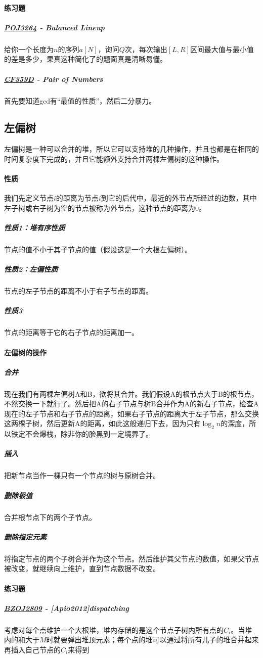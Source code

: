 \documentclass[]{cpp}
\begin{document}
\paragraph{练习题}
\subparagraph{\href{http://poj.org/problem?id=3264}{POJ3264} - Balanced Lineup}
	给你一个长度为$n$的序列$a[N]$，询问$Q$次，每次输出$[L,R]$区间最大值与最小值的差是多少，果真这种简化了的题面真是清晰易懂。
\subparagraph{\href{http://codeforces.com/problemset/problem/359/D}{CF359D} - Pair of Numbers} 首先要知道gcd有“最值的性质”，然后二分暴力。
\subsection{左偏树} 左偏树是一种可以合并的堆，所以它可以支持堆的几种操作，并且也都是在相同的时间复杂度下完成的，并且它能额外支持合并两棵左偏树的这种操作。
\paragraph{性质} 我们先定义节点$i$的距离为节点$i$到它的后代中，最近的外节点所经过的边数，其中左子树或右子树为空的节点被称为外节点，这种节点的距离为$0$。
\subparagraph{性质1：堆有序性质} 节点的值不小于其子节点的值（假设这是一个大根左偏树）。
\subparagraph{性质2：左偏性质} 节点的左子节点的距离不小于右子节点的距离。
\subparagraph{性质3} 节点的距离等于它的右子节点的距离加一。
\paragraph{左偏树的操作}
\subparagraph{合并} 
	现在我们有两棵左偏树A和B，欲将其合并。我们假设A的根节点大于B的根节点，不然交换一下就行了。然后把A的右子节点与树B合并作为A的新右子节点，检查A现在的左子节点和右子节点的距离，如果右子节点的距离大于左子节点，那么交换这两棵子树，然后更新A的距离，如此这般递归下去，因为只有$\log_2{n}$的深度，所以铁定不会爆栈，除非你的脸黑到一定境界了。
\subparagraph{插入} 把新节点当作一棵只有一个节点的树与原树合并。
\subparagraph{删除极值} 合并根节点下的两个子节点。
\subparagraph{删除指定元素} 将指定节点的两个子树合并作为这个节点。然后维护其父节点的数值，如果父节点被改变，就继续向上维护，直到节点数据不改变。
\paragraph{练习题}
\subparagraph{\href{http://www.lydsy.com/JudgeOnline/problem.php?id=2809}{BZOJ2809} - [Apio2012]dispatching}
	考虑对每个点维护一个大根堆，堆内存储的是这个节点子树内所有点的$C_i$。当堆内的和大于$M$时就要弹出堆顶元素；每个点的堆可以通过将所有儿子的堆合并起来再插入自己节点的$C_i$来得到
\end{document}
